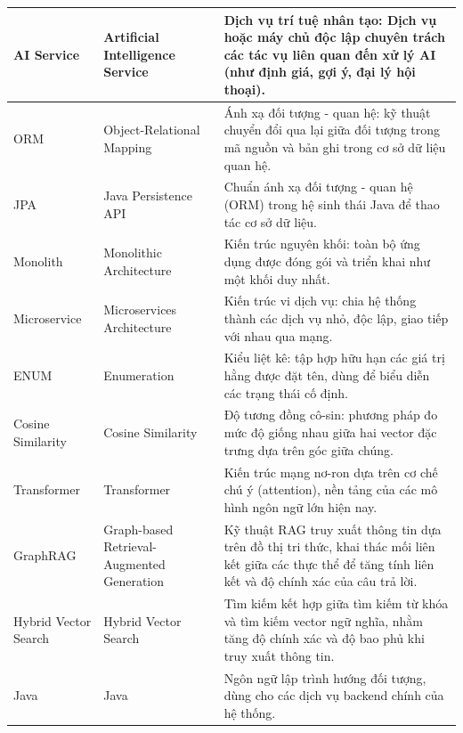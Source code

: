 \begin{longtable}{|L{0.18\textwidth}|L{0.27\textwidth}|L{0.49\textwidth}|}
AI Service & Artificial Intelligence Service & Dịch vụ trí tuệ nhân tạo: Dịch vụ hoặc máy chủ độc lập chuyên trách các tác vụ liên quan đến xử lý AI (như định giá, gợi ý, đại lý hội thoại). \\
\hline

ORM & Object-Relational Mapping & Ánh xạ đối tượng - quan hệ: kỹ thuật chuyển đổi qua lại giữa đối tượng trong mã nguồn và bản ghi trong cơ sở dữ liệu quan hệ. \\
\hline

JPA & Java Persistence API & Chuẩn ánh xạ đối tượng - quan hệ (ORM) trong hệ sinh thái Java để thao tác cơ sở dữ liệu. \\
\hline

Monolith & Monolithic Architecture & Kiến trúc nguyên khối: toàn bộ ứng dụng được đóng gói và triển khai như một khối duy nhất. \\
\hline

Microservice & Microservices Architecture & Kiến trúc vi dịch vụ: chia hệ thống thành các dịch vụ nhỏ, độc lập, giao tiếp với nhau qua mạng. \\
\hline

ENUM & Enumeration & Kiểu liệt kê: tập hợp hữu hạn các giá trị hằng được đặt tên, dùng để biểu diễn các trạng thái cố định. \\
\hline

Cosine Similarity & Cosine Similarity & Độ tương đồng cô-sin: phương pháp đo mức độ giống nhau giữa hai vector đặc trưng dựa trên góc giữa chúng. \\
\hline

Transformer & Transformer & Kiến trúc mạng nơ-ron dựa trên cơ chế chú ý (attention), nền tảng của các mô hình ngôn ngữ lớn hiện nay. \\
\hline

GraphRAG & Graph-based Retrieval-Augmented Generation & Kỹ thuật RAG truy xuất thông tin dựa trên đồ thị tri thức, khai thác mối liên kết giữa các thực thể để tăng tính liên kết và độ chính xác của câu trả lời. \\
\hline

Hybrid Vector Search & Hybrid Vector Search & Tìm kiếm kết hợp giữa tìm kiếm từ khóa và tìm kiếm vector ngữ nghĩa, nhằm tăng độ chính xác và độ bao phủ khi truy xuất thông tin. \\
\hline

Java & Java & Ngôn ngữ lập trình hướng đối tượng, dùng cho các dịch vụ backend chính của hệ thống. \\
\hline


\end{longtable}
